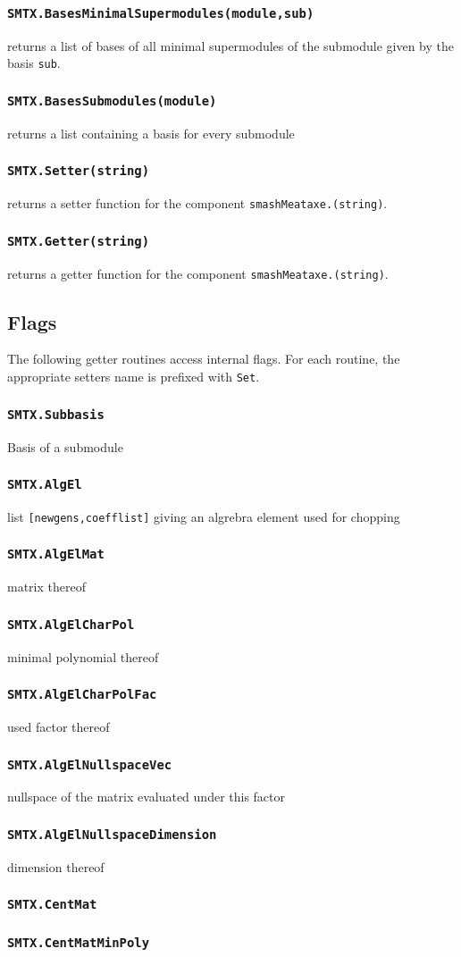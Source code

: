 \documentclass[12pt]{article}
\def\smtxcmd#1{\subsubsection*{{\tt #1}}}
\begin{document}
\smtxcmd{SMTX.BasesMinimalSupermodules(module,sub)}
returns a list of bases of all minimal supermodules of the submodule given by
the basis {\tt sub}.

\smtxcmd{SMTX.BasesSubmodules(module)}
returns a list containing a basis for every submodule

\smtxcmd{SMTX.Setter(string)}
returns a setter function for the component {\tt smashMeataxe.(string)}.

\smtxcmd{SMTX.Getter(string)}
returns a getter function for the component {\tt smashMeataxe.(string)}.

\subsection*{Flags}

The following getter routines access internal flags. For each routine, the
appropriate setters name is prefixed with {\tt Set}.

\smtxcmd{SMTX.Subbasis}
Basis of a submodule

\smtxcmd{SMTX.AlgEl}
list {\tt[newgens,coefflist]} giving an algrebra element used for chopping

\smtxcmd{SMTX.AlgElMat}
matrix thereof

\smtxcmd{SMTX.AlgElCharPol}
minimal polynomial thereof

\smtxcmd{SMTX.AlgElCharPolFac}
used factor thereof

\smtxcmd{SMTX.AlgElNullspaceVec}
nullspace of the matrix evaluated under this factor

\smtxcmd{SMTX.AlgElNullspaceDimension}
dimension thereof

\smtxcmd{SMTX.CentMat}

\smtxcmd{SMTX.CentMatMinPoly}

\newpage
\end{document}
